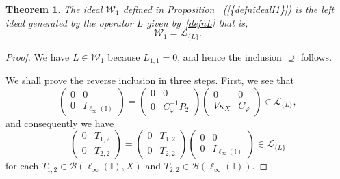 \documentclass[12pt]{amsart}
\newtheorem{theorem}{Theorem}[section]
\theoremstyle{definition}
\numberwithin{equation}{section}
\begin{document}
\begin{theorem}\label{leftidealgenbyL}
  The ideal $\mathscr{W}_1$ defined in
  Proposition~{\normalfont{\ref{twosidedidealsinBE}}}  {{\normalfont\textrm{(\ref{{defnidealI1}})}}} is the left ideal generated by the operator
  $L$ given by~\eqref{defnL}{\normalfont{;}} that is,
  \[ \mathscr{W}_1 = \mathscr{L}_{\{L\}}. \]
\end{theorem}
\begin{proof}
  We have $L\in\mathscr{W}_1$ because $L_{1,1} = 0$, and hence the
  inclusion $\supseteq$ follows.

  We shall prove the reverse inclusion in three steps. First, we see
  that
  \[ \begin{pmatrix} 0 & 0\\ 0 &
    I_{\ell_\infty(\mathbb{I})} \end{pmatrix} = \begin{pmatrix} 0 & 0\\
    0 & C_{\ensuremath{\varphi}}^{-1}P_2 \end{pmatrix} \begin{pmatrix} 0 & 0\\
    V\kappa_X & 
    C_{\ensuremath{\varphi}} \end{pmatrix}\in \mathscr{L}_{\{L\}}, \] and consequently we have
  \begin{equation}\label{leftidealgenbyLeq1}
    \begin{pmatrix} 0 & T_{1,2}\\ 0 & T_{2,2}\end{pmatrix} = 
    \begin{pmatrix} 0 & T_{1,2}\\ 0 &
      T_{2,2} \end{pmatrix}\begin{pmatrix} 0 & 0\\ 0 & 
      I_{\ell_\infty(\mathbb{I})} \end{pmatrix}\in\mathscr{L}_{\{L\}}
  \end{equation}   
  for each $T_{1,2}\in\mathscr{B}(\ell_\infty(\mathbb{I}),X)$ and
  $T_{2,2}\in\mathscr{B}(\ell_\infty(\mathbb{I}))$.
  

\end{proof}
\end{document}
